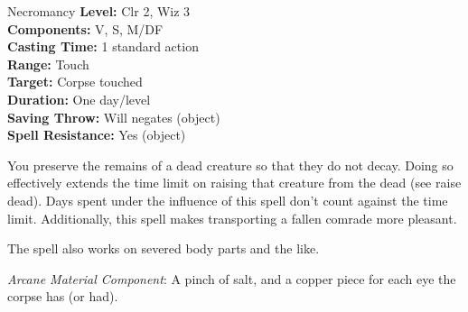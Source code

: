{Necromancy}
{
	\textbf{Level:}
	Clr 2, Wiz 3\\
	\textbf{Components:}
	V, S, M/DF\\
	\textbf{Casting Time:}
	1 standard action\\
	\textbf{Range:}
	Touch\\
	\textbf{Target:}
	Corpse touched\\
	\textbf{Duration:}
	One day/level\\
	\textbf{Saving Throw:}
	Will negates (object)\\
	\textbf{Spell Resistance:}
	Yes (object)\\
}
{
	You preserve the remains of a dead creature so that they do not decay. Doing so effectively extends the time limit on raising that creature from the dead (see raise dead). Days spent under the influence of this spell don't count against the time limit. Additionally, this spell makes transporting a fallen comrade more pleasant.

	The spell also works on severed body parts and the like.

	\textit{Arcane Material Component}:
	A pinch of salt, and a copper piece for each eye the corpse has (or had).

}

